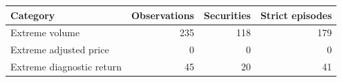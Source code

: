 \begin{tabular}{@{}lrrr@{}}
\toprule
Category & Observations & Securities & Strict episodes \\
\midrule
Extreme volume & 235 & 118 & 179 \\
Extreme adjusted price & 0 & 0 & 0 \\
Extreme diagnostic return & 45 & 20 & 41 \\
\bottomrule
\end{tabular}
